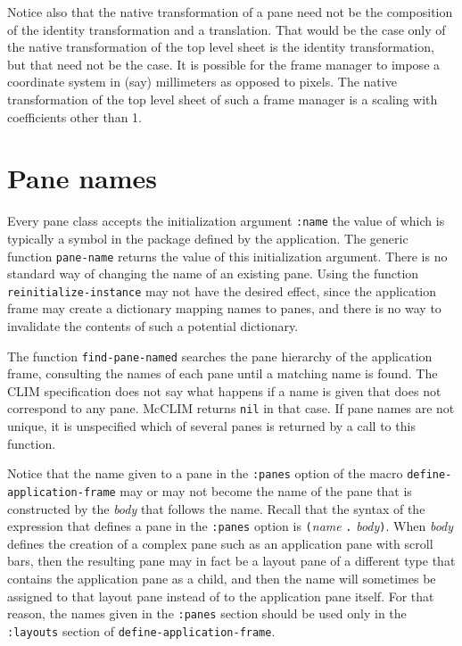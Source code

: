 Notice also that the native transformation of a pane need not be the
composition of the identity transformation and a translation.  That
would be the case only of the native transformation of the top level
sheet is the identity transformation, but that need not be the case.  It
is possible for the frame manager to impose a coordinate system in (say)
millimeters as opposed to pixels.  The native transformation of the top
level sheet of such a frame manager is a scaling with coefficients other
than 1.

\section{Pane names}

Every pane class accepts the initialization argument \texttt{:name}
the value of which is typically a symbol in the package defined by the
application.  The generic function \texttt{pane-name} returns the
value of this initialization argument.  There is no standard way of
changing the name of an existing pane.  Using the function
\texttt{reinitialize-instance} may not have the desired effect, since
the application frame may create a dictionary mapping names to panes,
and there is no way to invalidate the contents of such a potential
dictionary.

The function \texttt{find-pane-named} searches the pane hierarchy of
the application frame, consulting the names of each pane until a
matching name is found.  The CLIM specification does not say what
happens if a name is given that does not correspond to any pane.
McCLIM returns \texttt{nil} in that case.  If pane names are not
unique, it is unspecified which of several panes is returned by a call
to this function.

Notice that the name given to a pane in the \texttt{:panes} option of
the macro \texttt{define-application-frame} may or may not become the
name of the pane that is constructed by the \textit{body} that follows
the name.  Recall that the syntax of the expression that defines a
pane in the \texttt{:panes} option is \texttt{(}\textit{name}
\texttt{.} \textit{body}\texttt{)}.  When \textit{body} defines the
creation of a complex pane such as an application pane with scroll
bars, then the resulting pane may in fact be a layout pane of a
different type that contains the application pane as a child, and then
the name will sometimes be assigned to that layout pane instead of to
the application pane itself.  For that reason, the names given in the
\texttt{:panes} section should be used only in the \texttt{:layouts}
section of \texttt{define-application-frame}.

